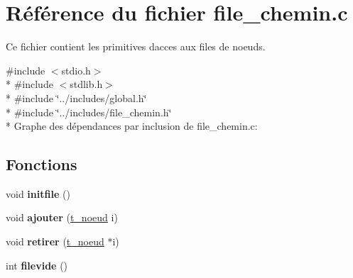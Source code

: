 \hypertarget{a00016}{}\section{Référence du fichier file\+\_\+chemin.\+c}
\label{a00016}


Ce fichier contient les primitives d\textquotesingle{}acces aux files de noeuds.  


{\ttfamily \#include $<$stdio.\+h$>$}\\*
{\ttfamily \#include $<$stdlib.\+h$>$}\\*
{\ttfamily \#include \char`\"{}../includes/global.\+h\char`\"{}}\\*
{\ttfamily \#include \char`\"{}../includes/file\+\_\+chemin.\+h\char`\"{}}\\*
Graphe des dépendances par inclusion de file\+\_\+chemin.\+c\+:
\subsection*{Fonctions}
\begin{DoxyCompactItemize}
\item 
void {\bfseries initfile} ()\hypertarget{a00016_aaf4be56c084d19f107f0da19c7c17216}{}\label{a00016_aaf4be56c084d19f107f0da19c7c17216}

\item 
void {\bfseries ajouter} (\hyperlink{a00009}{t\+\_\+noeud} i)\hypertarget{a00016_a102c68ec4d3006b943c1e63ad7bcd563}{}\label{a00016_a102c68ec4d3006b943c1e63ad7bcd563}

\item 
void {\bfseries retirer} (\hyperlink{a00009}{t\+\_\+noeud} $\ast$i)\hypertarget{a00016_a04ee1626a03e6867490802212829ccc5}{}\label{a00016_a04ee1626a03e6867490802212829ccc5}

\item 
int {\bfseries filevide} ()\hypertarget{a00016_a1dfabfa7163dc55b1cfa0f9317ee5bc8}{}\label{a00016_a1dfabfa7163dc55b1cfa0f9317ee5bc8}

\end{DoxyCompactItemize}

